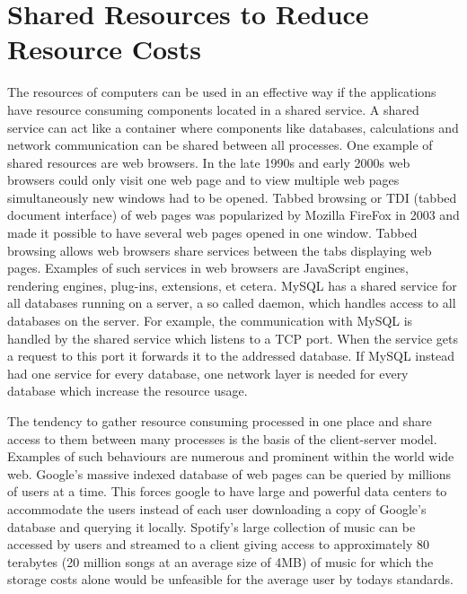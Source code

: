 \section{Shared Resources to Reduce Resource Costs}
The resources of computers can be used in an effective way if the applications have resource consuming components located in a shared service. A shared service can act like a container where components like databases, calculations and network communication can be shared between all processes. One example of shared resources are web browsers. In the late 1990s and early 2000s web browsers could only visit one web page and to view multiple web pages simultaneously new windows had to be opened. Tabbed browsing or TDI (tabbed document interface) of web pages was popularized by Mozilla FireFox in 2003 and made it possible to have several web pages opened in one window. Tabbed browsing allows web browsers share services between the tabs displaying web pages. Examples of such services in web browsers are JavaScript engines, rendering engines, plug-ins, extensions, et cetera. 
MySQL has a shared service for all databases running on a server, a so called daemon, which handles access to all databases on the server. For example, the communication with MySQL is handled by the shared service which listens to a TCP port. When the service gets a request to this port it forwards it to the addressed database. If MySQL instead had one service for every database, one network layer is needed for every database which increase the resource usage. 

The tendency to gather resource consuming processed in one place and share access to them between many processes is the basis of the client-server model. Examples of such behaviours are numerous and prominent within the world wide web. Google's massive indexed database of web pages can be queried by millions of users at a time. This forces google to have large and powerful data centers to accommodate the users instead of each user downloading a copy of Google's database and querying it locally. Spotify's large collection of music can be accessed by users and streamed to a client giving access to approximately 80 terabytes (20 million songs at an average size of 4MB) of music for which the storage costs alone would be unfeasible for the average user by todays standards.
